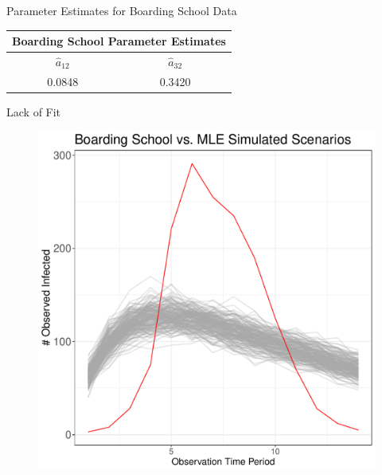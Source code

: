 \documentclass[10pt,table]{beamer}
\begin{document}
\begin{frame}{Parameter Estimates for Boarding School Data}
\begin{table}
\centering
\setlength{\tabcolsep}{30pt}
\begin{tabular}{|c|c|}
\hline
\multicolumn{2}{|c|}{Boarding School Parameter Estimates} \\
\hline
$\hat{a}_{12}$ & $\hat{a}_{32}$ \\ \hline
0.0848 & 0.3420 \\ \hline

\end{tabular}

\label{tab2}
\end{table}
\end{frame}
\begin{frame}{Lack of Fit}
\begin{figure}
\centering
\begin{minipage}{.4\textwidth}
\includegraphics[width=1\linewidth]{LackOfFit.pdf}
\end{minipage}%
\begin{minipage}{.4\textwidth}


\end{minipage}
\end{figure}
\end{frame}
\end{document}
